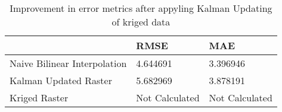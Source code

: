 \begin{table}
\caption{Improvement in error metrics after appyling Kalman Updating of kriged data}
\label{tab:Oahu7_lidar_error}
\begin{tabular}{lll}
\toprule
 & RMSE & MAE \\
\midrule
Naive Bilinear Interpolation & 4.644691 & 3.396946 \\
Kalman Updated Raster & 5.682969 & 3.878191 \\
Kriged Raster & Not Calculated & Not Calculated \\
\bottomrule
\end{tabular}
\end{table}
